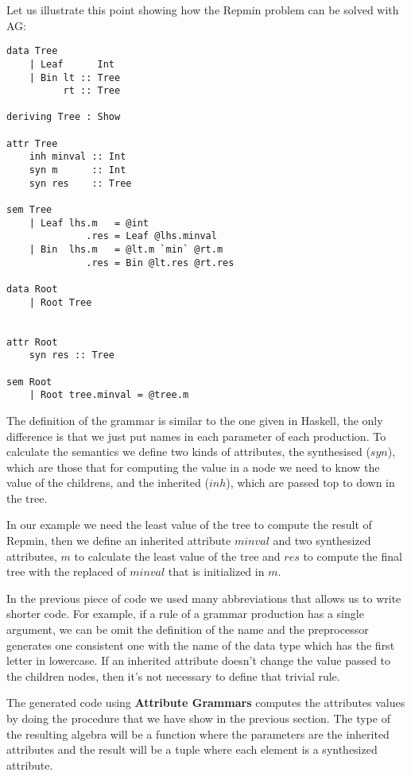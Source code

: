 \documentclass[a4paper,10pt]{article}
\begin{document}
Let us illustrate this point showing how the Repmin problem can be solved with AG:

\begin{lstlisting}
data Tree
    | Leaf      Int
    | Bin lt :: Tree
	      rt :: Tree

deriving Tree : Show
	  
attr Tree
    inh minval :: Int
    syn m      :: Int
    syn res    :: Tree
      
sem Tree
    | Leaf lhs.m   = @int
              .res = Leaf @lhs.minval
	| Bin  lhs.m   = @lt.m `min` @rt.m
              .res = Bin @lt.res @rt.res

data Root
	| Root Tree
      
      
attr Root
	syn res :: Tree
      
sem Root
	| Root tree.minval = @tree.m
\end{lstlisting}

The definition of the grammar is similar to the one given in Haskell, the only difference is that we 
just put names in each parameter of each production. To calculate the semantics we define two kinds of 
attributes, the synthesised ($syn$), which are those that for computing the value in a node we need to 
know the value of the childrens, and the inherited ($inh$), which are passed top to down in the tree.

In our example we need the least value of the tree to compute the result of Repmin, then we define
an inherited attribute $minval$ and two synthesized attributes, $m$ to calculate the least value
of the tree and $res$ to compute the final tree with the replaced of $minval$ that is initialized
in $m$.
  
In the previous piece of code we used many abbreviations that allows us to write shorter code.
For example, if a rule of a grammar production has a single argument, we can be omit the definition of
the name and the preprocessor generates one consistent one with the name of the data type which has the
first letter in lowercase. If an inherited attribute doesn't change the value passed to the children
nodes, then it's not necessary to define that trivial rule.

The generated code using \textbf{Attribute Grammars} computes the attributes values by doing the
procedure that we have show in the previous section. The type of the resulting algebra will be a function
where the parameters are the inherited attributes and the result will be a tuple where each element
is a synthesized attribute.
  
\end{document}
